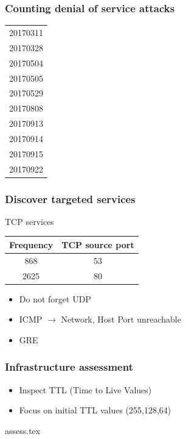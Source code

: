 \documentclass{beamer}
\begin{document}
\begin{frame}
\frametitle{Counting denial of service attacks}
\begin{center}
    \begin{tabular}{l}
    20170311\\
    20170328\\
    20170504\\
    20170505\\
    20170529\\
    20170808\\
    20170913\\
    20170914\\
    20170915\\
    20170922\\
    \end{tabular}
\end{center}
\end{frame}

\begin{frame}
\frametitle{Discover targeted services}

TCP services



\begin{center}
    \begin{tabular}{cc}
        Frequency & TCP source port\\
        \hline
        868 & 53 \\
        2625 & 80\\
    \end{tabular}
\end{center}

\begin{itemize}
    \item Do not forget UDP
    \item ICMP $\to$ Network, Host Port unreachable
    \item GRE
\end{itemize}
\end{frame}

\begin{frame}
\frametitle{Infrastructure assessment}
\begin{itemize}
    \item Inspect TTL (Time to Live Values)
    \item Focus on initial TTL values (255,128,64)
\end{itemize}

 {assess.tex}

\end{frame}
\end{document}
